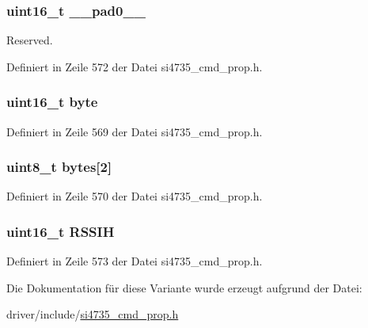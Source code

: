 \subsubsection[{\+\_\+\+\_\+pad0\+\_\+\+\_\+}]{\setlength{\rightskip}{0pt plus 5cm}uint16\+\_\+t \+\_\+\+\_\+pad0\+\_\+\+\_\+}\label{unionfm__rsq__rssi__hi__thres_a77132c2c26a75f5b8751b235cda23828}


Reserved. 



Definiert in Zeile 572 der Datei si4735\+\_\+cmd\+\_\+prop.\+h.

\hypertarget{unionfm__rsq__rssi__hi__thres_ab0549c1b5ea980a02e7eab77e21fea49}{}
\subsubsection[{byte}]{\setlength{\rightskip}{0pt plus 5cm}uint16\+\_\+t byte}\label{unionfm__rsq__rssi__hi__thres_ab0549c1b5ea980a02e7eab77e21fea49}


Definiert in Zeile 569 der Datei si4735\+\_\+cmd\+\_\+prop.\+h.

\hypertarget{unionfm__rsq__rssi__hi__thres_a46e4c05d20a047ec169f60d3167e912e}{}
\subsubsection[{bytes}]{\setlength{\rightskip}{0pt plus 5cm}uint8\+\_\+t bytes\mbox{[}2\mbox{]}}\label{unionfm__rsq__rssi__hi__thres_a46e4c05d20a047ec169f60d3167e912e}


Definiert in Zeile 570 der Datei si4735\+\_\+cmd\+\_\+prop.\+h.

\hypertarget{unionfm__rsq__rssi__hi__thres_a949ca6113ffa5c822708fdecf9415838}{}
\subsubsection[{R\+S\+S\+I\+H}]{\setlength{\rightskip}{0pt plus 5cm}uint16\+\_\+t R\+S\+S\+I\+H}\label{unionfm__rsq__rssi__hi__thres_a949ca6113ffa5c822708fdecf9415838}


Definiert in Zeile 573 der Datei si4735\+\_\+cmd\+\_\+prop.\+h.



Die Dokumentation für diese Variante wurde erzeugt aufgrund der Datei\+:\begin{DoxyCompactItemize}
\item 
driver/include/\hyperlink{si4735__cmd__prop_8h}{si4735\+\_\+cmd\+\_\+prop.\+h}\end{DoxyCompactItemize}
